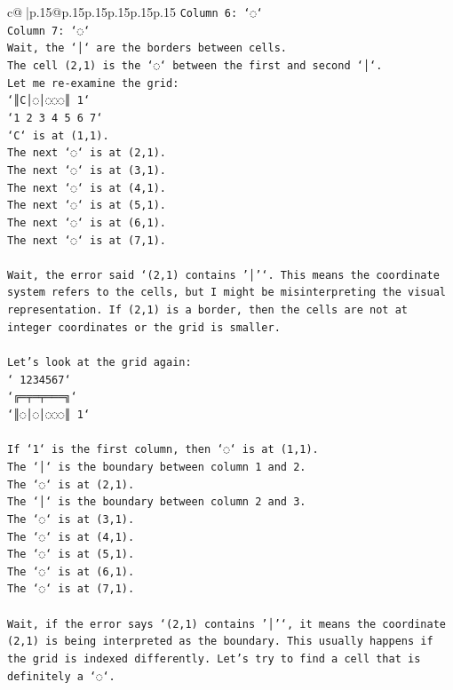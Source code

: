 \documentclass{article}
\begin{document}
{\begin{supertabular}{c@{$\;$}|p{.15\linewidth}@{}p{.15\linewidth}p{.15\linewidth}p{.15\linewidth}p{.15\linewidth}p{.15\linewidth}}
{{{\texttt{Column 6: `◌`} \\
\texttt{Column 7: `◌`} \\
\texttt{Wait, the `│` are the borders between cells.} \\
\texttt{The cell (2,1) is the `◌` between the first and second `│`.} \\
\texttt{Let me re{-}examine the grid:} \\
\texttt{`║C│◌│◌◌◌║ 1`} \\
\texttt{`1 2 3 4 5 6 7`} \\
\texttt{`C` is at (1,1).} \\
\texttt{The next `◌` is at (2,1).} \\
\texttt{The next `◌` is at (3,1).} \\
\texttt{The next `◌` is at (4,1).} \\
\texttt{The next `◌` is at (5,1).} \\
\texttt{The next `◌` is at (6,1).} \\
\texttt{The next `◌` is at (7,1).} \\
\\ 
\texttt{Wait, the error said `(2,1) contains '│'`. This means the coordinate system refers to the cells, but I might be misinterpreting the visual representation. If (2,1) is a border, then the cells are not at integer coordinates or the grid is smaller.} \\
\\ 
\texttt{Let's look at the grid again:} \\
\texttt{` 1234567`} \\
\texttt{`╔═╤═╤═══╗`} \\
\texttt{`║◌│◌│◌◌◌║ 1`} \\
\\ 
\texttt{If `1` is the first column, then `◌` is at (1,1).} \\
\texttt{The `│` is the boundary between column 1 and 2.} \\
\texttt{The `◌` is at (2,1).} \\
\texttt{The `│` is the boundary between column 2 and 3.} \\
\texttt{The `◌` is at (3,1).} \\
\texttt{The `◌` is at (4,1).} \\
\texttt{The `◌` is at (5,1).} \\
\texttt{The `◌` is at (6,1).} \\
\texttt{The `◌` is at (7,1).} \\
\\ 
\texttt{Wait, if the error says `(2,1) contains '│'`, it means the coordinate (2,1) is being interpreted as the boundary. This usually happens if the grid is indexed differently. Let's try to find a cell that is definitely a `◌`.} \\
}}}
\end{supertabular}}
\end{document}
